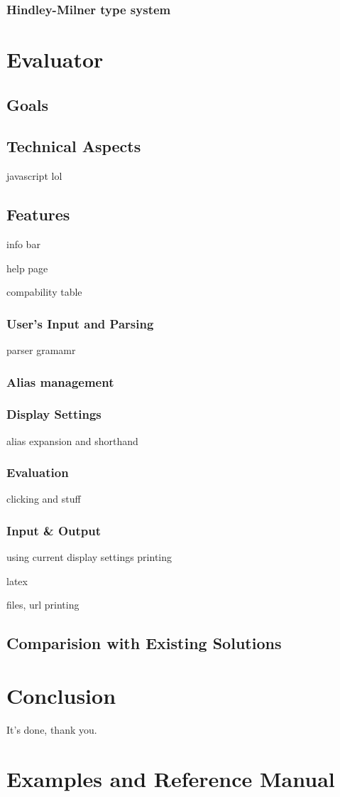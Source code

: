 \documentclass[a4paper,10pt]{article}
\begin{document}
\subsubsection{Hindley-Milner type system}

\section{Evaluator}
\subsection{Goals}
\subsection{Technical Aspects}
javascript lol
\subsection{Features}
info bar

help page


compability table

\subsubsection{User's Input and Parsing}
parser gramamr

\subsubsection{Alias management}

\subsubsection{Display Settings}
alias expansion and shorthand

\subsubsection{Evaluation}
clicking and stuff

\subsubsection{Input \& Output}
using current display settings
printing

latex

files, url
printing

\subsection{Comparision with Existing Solutions}

\section{Conclusion}
It's done, thank you.

\appendix
\section{Examples and Reference Manual}
\end{document}
